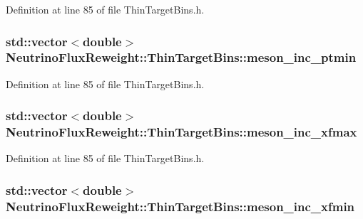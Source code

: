 Definition at line 85 of file Thin\-Target\-Bins.\-h.

\hypertarget{class_neutrino_flux_reweight_1_1_thin_target_bins_af50653a9d0674d3e679dcb93292b6465}{
\subsubsection[{meson\-\_\-inc\-\_\-ptmin}]{\setlength{\rightskip}{0pt plus 5cm}std\-::vector$<$double$>$ Neutrino\-Flux\-Reweight\-::\-Thin\-Target\-Bins\-::meson\-\_\-inc\-\_\-ptmin}}\label{class_neutrino_flux_reweight_1_1_thin_target_bins_af50653a9d0674d3e679dcb93292b6465}


Definition at line 85 of file Thin\-Target\-Bins.\-h.

\hypertarget{class_neutrino_flux_reweight_1_1_thin_target_bins_ae58bdf98e3c4106b89e2764217a5a556}{
\subsubsection[{meson\-\_\-inc\-\_\-xfmax}]{\setlength{\rightskip}{0pt plus 5cm}std\-::vector$<$double$>$ Neutrino\-Flux\-Reweight\-::\-Thin\-Target\-Bins\-::meson\-\_\-inc\-\_\-xfmax}}\label{class_neutrino_flux_reweight_1_1_thin_target_bins_ae58bdf98e3c4106b89e2764217a5a556}


Definition at line 85 of file Thin\-Target\-Bins.\-h.

\hypertarget{class_neutrino_flux_reweight_1_1_thin_target_bins_a9693301d7ded98e2204a8f8a001beae6}{
\subsubsection[{meson\-\_\-inc\-\_\-xfmin}]{\setlength{\rightskip}{0pt plus 5cm}std\-::vector$<$double$>$ Neutrino\-Flux\-Reweight\-::\-Thin\-Target\-Bins\-::meson\-\_\-inc\-\_\-xfmin}}\label{class_neutrino_flux_reweight_1_1_thin_target_bins_a9693301d7ded98e2204a8f8a001beae6}


